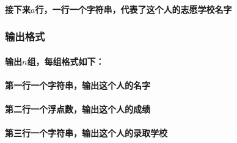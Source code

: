 \documentclass[final,11pt,oneside,UTF8]{report}
\begin{document}
\paragraph{
    接下来$a$行，一行一个字符串，代表了这个人的志愿学校名字}
\subsubsection{输出格式}
\paragraph{输出$n$组，每组格式如下：
}
\paragraph{
    第一行一个字符串，输出这个人的名字
}
\paragraph{
    第二行一个浮点数，输出这个人的成绩
}
\paragraph{
    第三行一个字符串，输出这个人的录取学校}
\end{document}
